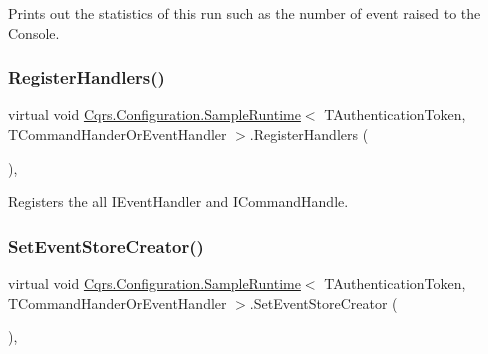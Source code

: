 Prints out the statistics of this run such as the number of event raised to the Console. 

\mbox{\label{classCqrs_1_1Configuration_1_1SampleRuntime_a001d4810823f11dee9144834182f8e05_a001d4810823f11dee9144834182f8e05}} 
\subsubsection{\texorpdfstring{Register\+Handlers()}{RegisterHandlers()}}
{\footnotesize\ttfamily virtual void \hyperlink{classCqrs_1_1Configuration_1_1SampleRuntime}{Cqrs.\+Configuration.\+Sample\+Runtime}$<$ T\+Authentication\+Token, T\+Command\+Hander\+Or\+Event\+Handler $>$.Register\+Handlers (\begin{DoxyParamCaption}{ }\end{DoxyParamCaption})\hspace{0.3cm}{\ttfamily [protected]}, {\ttfamily [virtual]}}



Registers the all I\+Event\+Handler and I\+Command\+Handle. 

\mbox{\label{classCqrs_1_1Configuration_1_1SampleRuntime_a08ac580aad6ab03f16fd3171f21dfe59_a08ac580aad6ab03f16fd3171f21dfe59}} 
\subsubsection{\texorpdfstring{Set\+Event\+Store\+Creator()}{SetEventStoreCreator()}}
{\footnotesize\ttfamily virtual void \hyperlink{classCqrs_1_1Configuration_1_1SampleRuntime}{Cqrs.\+Configuration.\+Sample\+Runtime}$<$ T\+Authentication\+Token, T\+Command\+Hander\+Or\+Event\+Handler $>$.Set\+Event\+Store\+Creator (\begin{DoxyParamCaption}{ }\end{DoxyParamCaption})\hspace{0.3cm}{\ttfamily [protected]}, {\ttfamily [virtual]}}



